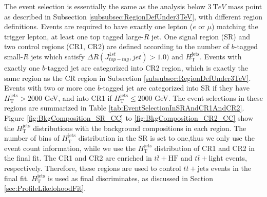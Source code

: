 The event selection is essentially the same as the analysis below $3 ~ {\mathrm TeV}$ mass point as described in Subsection \ref{subsubsec:RegionDefUnder3TeV},
with different region definitions.
Events are required to have exactly one lepton ($e$ or $\mu$) matching the trigger lepton, at least one top tagged large-$R$ jet.
One signal region (SR) and two control regions (CR1, CR2) are defined according to the number of $b$-tagged small-$R$ jets which satisfy $\Delta R(J^{1st}_{top-tag},jet)>1.0)$ and $H_{\text{T}}^{\text{jets}}$. 
Events with exactly one $b$-tagged jet are categorized into CR2 region, which is exactly the same region as the CR region in Subsection \ref{subsubsec:RegionDefUnder3TeV}.
Events with two or more one $b$-tagged jet are categorized into SR if they have $H_{\text{T}}^{\text{jets}}> 2000$ GeV, and into CR1 if $H_{\text{T}}^{\text{jets}}\leq 2000$ GeV.
%
The event selections in these regions are summarized in Table \ref{tab:EventSelectionInSRAndCR1AndCR2}. 
Figure \ref{fig:BkgComposition_SR_CC} to \ref{fig:BkgComposition_CR2_CC} show the $H_{\text{T}}^{\text{jets}}$ distributions with the background compositions in each region. 
 The number of bins of $H_{\text{T}}^{\text{jets}}$ distribution in the SR is set to one,thus we only use the event count information, while we use the $H_{\text{T}}^{\text{jets}}$ distribution of CR1 and CR2 in the final fit.
 The CR1 and CR2 are enriched in $t\bar{t}+\text{HF}$ and $t\bar{t}+\text{light}$ events, respectively. Therefore, these regions are used to control $t\bar{t}+\text{jets}$ events in the final fit. 
$H_{\text{T}}^{\text{jets}}$ is used as final discriminates, as discussed in Section \ref{sec:ProfileLikelohoodFit}.

